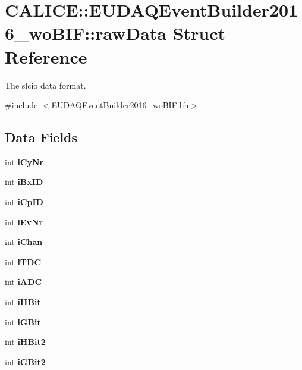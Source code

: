 \section{CALICE::EUDAQEventBuilder2016\_\-woBIF::rawData Struct Reference}
\label{structCALICE_1_1EUDAQEventBuilder2016__woBIF_1_1rawData}


The slcio data format.  


{\ttfamily \#include $<$EUDAQEventBuilder2016\_\-woBIF.hh$>$}\subsection*{Data Fields}
\begin{DoxyCompactItemize}
\item 
int {\bfseries iCyNr}\label{structCALICE_1_1EUDAQEventBuilder2016__woBIF_1_1rawData_a6a64e70bd4342445819aafaff55cde96}

\item 
int {\bfseries iBxID}\label{structCALICE_1_1EUDAQEventBuilder2016__woBIF_1_1rawData_a203dc50d5e7cf14bb33a35205e662a01}

\item 
int {\bfseries iCpID}\label{structCALICE_1_1EUDAQEventBuilder2016__woBIF_1_1rawData_af2436c619f2ae2ccb7058acfcbb7847d}

\item 
int {\bfseries iEvNr}\label{structCALICE_1_1EUDAQEventBuilder2016__woBIF_1_1rawData_aab3c629ab26381d91723fe53e78f6b0a}

\item 
int {\bfseries iChan}\label{structCALICE_1_1EUDAQEventBuilder2016__woBIF_1_1rawData_aedadfc60836e09c517ed1317a11326d5}

\item 
int {\bfseries iTDC}\label{structCALICE_1_1EUDAQEventBuilder2016__woBIF_1_1rawData_ad0a510cad8868942619ca43d89aa8e3e}

\item 
int {\bfseries iADC}\label{structCALICE_1_1EUDAQEventBuilder2016__woBIF_1_1rawData_afbc9688928feced75387643ab18cbada}

\item 
int {\bfseries iHBit}\label{structCALICE_1_1EUDAQEventBuilder2016__woBIF_1_1rawData_a7af0294a0a633f9b32c10888f90ac613}

\item 
int {\bfseries iGBit}\label{structCALICE_1_1EUDAQEventBuilder2016__woBIF_1_1rawData_ad75449bd3f2e3d2e4ccac166e51fac5b}

\item 
int {\bfseries iHBit2}\label{structCALICE_1_1EUDAQEventBuilder2016__woBIF_1_1rawData_a2f899ab0ba3d0a50f277a7843893a2a9}

\item 
int {\bfseries iGBit2}\label{structCALICE_1_1EUDAQEventBuilder2016__woBIF_1_1rawData_a82e6c705987f3f1e12c212c541c9d78a}

\end{DoxyCompactItemize}


